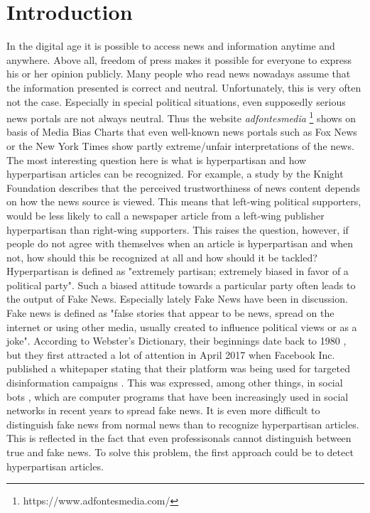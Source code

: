 \documentclass[a4paper, 11pt,titlepage,oneside,openany]{book}
\begin{document}

\newpage



\chapter{Introduction}
In the digital age it is possible to access news and information anytime and anywhere. Above all, freedom of press makes it possible for everyone to express his or her opinion publicly. Many people who read news nowadays assume that the information presented is correct and neutral. Unfortunately, this is very often not the case. Especially in special political situations, even supposedly serious news portals are not always neutral.  Thus the website \textit{adfontesmedia} \footnote{https://www.adfontesmedia.com/} shows on basis of Media Bias Charts that even well-known news portals such as Fox News or the New York Times show partly extreme/unfair interpretations of the news. The most interesting question here is what is hyperpartisan and how hyperpartisan articles can be recognized. For example, a study by the Knight Foundation \cite{study} describes that the perceived trustworthiness of news content depends on how the news source is viewed.  This means that left-wing political supporters, would be less likely to call a newspaper article from a left-wing publisher hyperpartisan than right-wing supporters. This raises the question, however, if people do not agree with themselves when an article is hyperpartisan and when not, how should this be recognized at all and how should it be tackled?  \\
\indent Hyperpartisan is defined as "extremely partisan; extremely biased in favor of a political party". Such a biased attitude towards a particular party often leads to the output of Fake News. Especially lately Fake News have been in discussion. Fake news is defined as "false stories that appear to be news, spread on the internet or using other media, usually created to influence political views or as a joke". According to Webster's Dictionary, their beginnings date back to 1980 \cite{webster}, but they first attracted a lot of attention in April 2017 when Facebook Inc. published a whitepaper stating that their platform was being used for targeted disinformation campaigns \cite{facebook}. This was expressed, among other things, in social bots \cite{socialbots}, which are computer programs that have been increasingly used in social networks in recent years to spread fake news. It is even more difficult to distinguish fake news from normal news than to recognize hyperpartisan articles. This is reflected in the fact that even professisonals cannot distinguish between true and fake news. To solve this problem, the first approach could be to detect hyperpartisan articles.  \\
\end{document}
